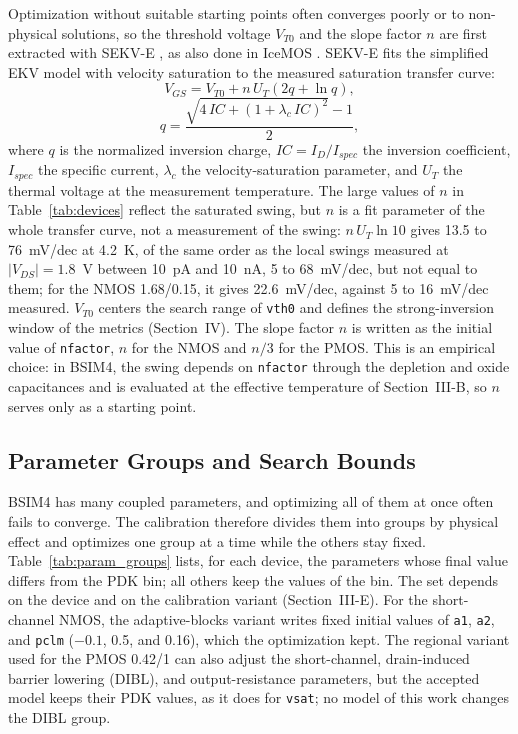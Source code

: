 \documentclass[a4paper,10pt,twoside,twocolumn,final]{JICS_LaTexGuidelines} %
\begin{document}
Optimization without suitable starting points often converges poorly or to non-physical solutions, so the threshold voltage $V_{T0}$ and the slope factor $n$ are first extracted with SEKV-E \cite{b12}, as also done in IceMOS \cite{b6}. SEKV-E fits the simplified EKV model with velocity saturation to the measured saturation transfer curve:
\begin{equation}
V_{GS}=V_{T0}+n\,U_T\left(2q+\ln q\right),
\label{eq:ekv}
\end{equation}
\begin{equation}
q=\frac{\sqrt{4\,IC+(1+\lambda_c\,IC)^2}-1}{2},
\label{eq:q}
\end{equation}
where $q$ is the normalized inversion charge, $IC=I_D/I_{spec}$ the inversion coefficient, $I_{spec}$ the specific current, $\lambda_c$ the velocity-saturation parameter, and $U_T$ the thermal voltage at the measurement temperature. The large values of $n$ in Table~\ref{tab:devices} reflect the saturated swing, but $n$ is a fit parameter of the whole transfer curve, not a measurement of the swing: $n\,U_T\ln 10$ gives 13.5 to 76~mV/dec at 4.2~K, of the same order as the local swings measured at $|V_{DS}|=1.8$~V between 10~pA and 10~nA, 5 to 68~mV/dec, but not equal to them; for the NMOS 1.68/0.15, it gives 22.6~mV/dec, against 5 to 16~mV/dec measured. $V_{T0}$ centers the search range of \texttt{vth0} and defines the strong-inversion window of the metrics (Section~IV). The slope factor $n$ is written as the initial value of \texttt{nfactor}, $n$ for the NMOS and $n/3$ for the PMOS. This is an empirical choice: in BSIM4, the swing depends on \texttt{nfactor} through the depletion and oxide capacitances and is evaluated at the effective temperature of Section~III-B, so $n$ serves only as a starting point.

\subsection{Parameter Groups and Search Bounds}

BSIM4 has many coupled parameters, and optimizing all of them at once often fails to converge. The calibration therefore divides them into groups by physical effect and optimizes one group at a time while the others stay fixed. Table~\ref{tab:param_groups} lists, for each device, the parameters whose final value differs from the PDK bin; all others keep the values of the bin. The set depends on the device and on the calibration variant (Section~III-E). For the short-channel NMOS, the adaptive-blocks variant writes fixed initial values of \texttt{a1}, \texttt{a2}, and \texttt{pclm} ($-0.1$, 0.5, and 0.16), which the optimization kept. The regional variant used for the PMOS 0.42/1 can also adjust the short-channel, drain-induced barrier lowering (DIBL), and output-resistance parameters, but the accepted model keeps their PDK values, as it does for \texttt{vsat}; no model of this work changes the DIBL group.
\end{document}
